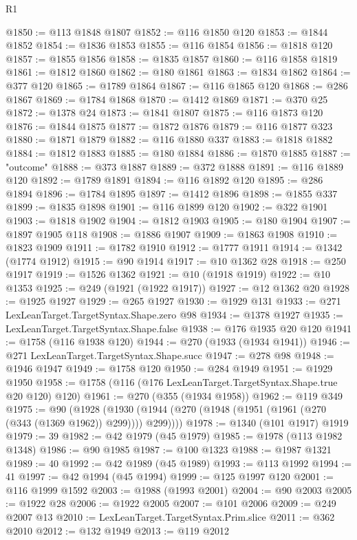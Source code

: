 \begin{lexlean}{R1}
\begin{coremodule}
@1850 := @113 @1848 @1807
@1852 := @116 @1850 @120
@1853 := @1844 @1852
@1854 := @1836 @1853
@1855 := @116 @1854
@1856 := @1818 @120
@1857 := @1855 @1856
@1858 := @1835 @1857
@1860 := @116 @1858 @1819
@1861 := @1812 @1860
@1862 := @180 @1861
@1863 := @1834 @1862
@1864 := @377 @120
@1865 := @1789 @1864
@1867 := @116 @1865 @120
@1868 := @286 @1867
@1869 := @1784 @1868
@1870 := @1412 @1869
@1871 := @370 @25
@1872 := @1378 @24
@1873 := @1841 @1807
@1875 := @116 @1873 @120
@1876 := @1844 @1875
@1877 := @1872 @1876
@1879 := @116 @1877 @323
@1880 := @1871 @1879
@1882 := @116 @1880 @337
@1883 := @1818 @1882
@1884 := @1812 @1883
@1885 := @180 @1884
@1886 := @1870 @1885
@1887 := "outcome"
@1888 := @373 @1887
@1889 := @372 @1888
@1891 := @116 @1889 @120
@1892 := @1789 @1891
@1894 := @116 @1892 @120
@1895 := @286 @1894
@1896 := @1784 @1895
@1897 := @1412 @1896
@1898 := @1855 @337
@1899 := @1835 @1898
@1901 := @116 @1899 @120
@1902 := @322 @1901
@1903 := @1818 @1902
@1904 := @1812 @1903
@1905 := @180 @1904
@1907 := @1897 @1905 @118
@1908 := @1886 @1907
@1909 := @1863 @1908
@1910 := @1823 @1909
@1911 := @1782 @1910
@1912 := @1777 @1911
@1914 := @1342 (@1774 @1912)
@1915 := @90 @1914
@1917 := @10 @1362 @28
@1918 := @250 @1917
@1919 := @1526 @1362
@1921 := @10 (@1918 @1919)
@1922 := @10 @1353
@1925 := @249 (@1921 (@1922 @1917))
@1927 := @12 @1362 @20
@1928 := @1925 @1927
@1929 := @265 @1927
@1930 := @1929 @131
@1933 := @271 LexLeanTarget.TargetSyntax.Shape.zero @98
@1934 := @1378 @1927
@1935 := LexLeanTarget.TargetSyntax.Shape.false
@1938 := @176 @1935 @20 @120
@1941 := @1758 (@116 @1938 @120)
@1944 := @270 (@1933 (@1934 @1941))
@1946 := @271 LexLeanTarget.TargetSyntax.Shape.succ
@1947 := @278 @98
@1948 := @1946 @1947
@1949 := @1758 @120
@1950 := @284 @1949
@1951 := @1929 @1950
@1958 := @1758 (@116 (@176 LexLeanTarget.TargetSyntax.Shape.true @20 @120) @120)
@1961 := @270 (@355 (@1934 @1958))
@1962 := @119 @349
@1975 := @90
    (@1928 (@1930 (@1944 (@270 (@1948 (@1951 (@1961 (@270 (@343 (@1369 @1962)) @299)))) @299))))
@1978 := @1340 (@101 @1917) @1919
@1979 := 39
@1982 := @42 @1979 (@45 @1979)
@1985 := @1978 (@113 @1982 @1348)
@1986 := @90 @1985
@1987 := @100 @1323
@1988 := @1987 @1321
@1989 := 40
@1992 := @42 @1989 (@45 @1989)
@1993 := @113 @1992
@1994 := 41
@1997 := @42 @1994 (@45 @1994)
@1999 := @125 @1997 @120
@2001 := @116 @1999 @1592
@2003 := @1988 (@1993 @2001)
@2004 := @90 @2003
@2005 := @1922 @28
@2006 := @1922 @2005
@2007 := @101 @2006
@2009 := @249 @2007 @13
@2010 := LexLeanTarget.TargetSyntax.Prim.slice
@2011 := @362 @2010
@2012 := @132 @1949
@2013 := @119 @2012

\end{coremodule}
\end{lexlean}
